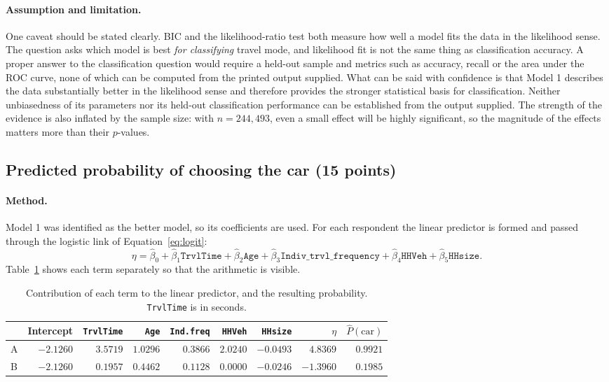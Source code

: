 \documentclass[11pt,a4paper]{article}
\newcommand{\code}[1]{\texttt{#1}}
\begin{document}
\paragraph{Assumption and limitation.} One caveat should be stated clearly. BIC and the
likelihood-ratio test both measure how well a model fits the data in the likelihood sense.
The question asks which model is best \emph{for classifying} travel mode, and likelihood
fit is not the same thing as classification accuracy. A proper answer to the classification
question would require a held-out sample and metrics such as accuracy, recall or the area
under the ROC curve, none of which can be computed from the printed output supplied. What
can be said with confidence is that Model 1 describes the data substantially better in the
likelihood sense and therefore provides the stronger statistical basis for classification.
Neither unbiasedness of its parameters nor its held-out classification performance can be
established from the output supplied. The strength of the evidence is also inflated by the
sample size: with $n = 244{,}493$, even a small effect will be highly significant, so the
magnitude of the effects matters more than their $p$-values.

\subsection{Predicted probability of choosing the car (15 points)}

\paragraph{Method.} Model 1 was identified as the better model, so its coefficients are
used. For each respondent the linear predictor is formed and passed through the logistic
link of Equation~\eqref{eq:logit}:
\[
\eta = \hat\beta_0
     + \hat\beta_1 \code{TrvlTime}
     + \hat\beta_2 \code{Age}
     + \hat\beta_3 \code{Indiv\_trvl\_frequency}
     + \hat\beta_4 \code{HHVeh}
     + \hat\beta_5 \code{HHsize} .
\]
Table~\ref{tab:contrib} shows each term separately so that the arithmetic is visible.

\begin{table}[H]
\centering
\caption{Contribution of each term to the linear predictor, and the resulting probability.
\code{TrvlTime} is in seconds.}
\label{tab:contrib}
\begin{tabular}{lrrrrrrrr}
\toprule
& Intercept & \code{TrvlTime} & \code{Age} & \code{Ind.freq} & \code{HHVeh} &
\code{HHsize} & $\eta$ & $\hat P(\text{car})$ \\
\midrule
A & $-2.1260$ & $3.5719$ & $1.0296$ & $0.3866$ & $2.0240$ & $-0.0493$ & $4.8369$ & $0.9921$ \\
B & $-2.1260$ & $0.1957$ & $0.4462$ & $0.1128$ & $0.0000$ & $-0.0246$ & $-1.3960$ & $0.1985$ \\
\bottomrule
\end{tabular}
\end{table}
\end{document}
